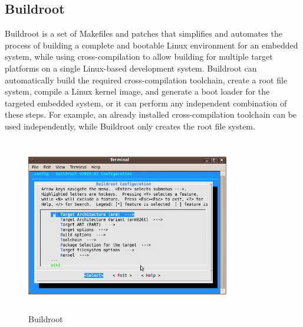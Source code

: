 \subsection{Buildroot} Buildroot is a set of Makefiles and patches that simplifies and automates the process of building a complete and bootable Linux environment for an embedded system, while using cross-compilation to allow building for multiple target platforms on a single Linux-based development system. Buildroot can automatically build the required cross-compilation toolchain, create a root file system, compile a Linux kernel image, and generate a boot loader for the targeted embedded system, or it can perform any independent combination of these steps. For example, an already installed cross-compilation toolchain can be used independently, while Buildroot only creates the root file system.
\begin{figure}[ht]
	\centering
        \includegraphics[width=3.5in, height=3in]{images/buildroot.png}
	\caption{Buildroot}
\end{figure}
